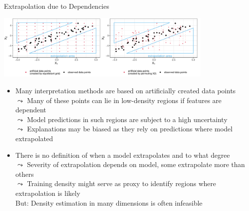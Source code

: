 \documentclass[11pt,compress,t,notes=noshow, aspectratio=169, xcolor=table]{beamer}
\begin{document}
\begin{frame}{Extrapolation due to Dependencies}
\centerline{\includegraphics[width=0.8\textwidth]{figure/extrapolation}}

\begin{itemize}
\item Many interpretation methods are based on
artificially created data points \\
$\leadsto$ Many of these points can lie in low-density regions if features are dependent\\
$\leadsto$ Model predictions in such regions are subject to a high uncertainty\\ %
$\leadsto$ Explanations may be biased as they rely on predictions where model extrapolated\\
\pause
\item There is no definition of when a model extrapolates and to what degree \\
$\leadsto$ Severity of extrapolation depends on model, some extrapolate more than others \\
$\leadsto$ Training density might serve as proxy to identify regions where extrapolation is likely \\
\phantom{$\leadsto$} But: Density estimation in many dimensions is often infeasible
\end{itemize}

\end{frame}
\end{document}
